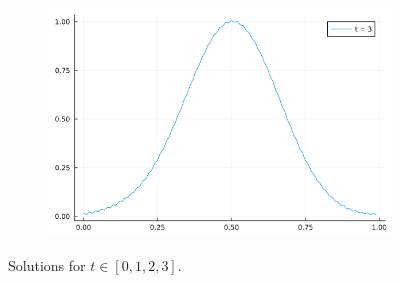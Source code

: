 \documentclass[12pt]{report}
\begin{document}
\begin{solution}
\begin{figure}[H]
\begin{subfigure}{0.495\linewidth}
      \end{subfigure}
      \begin{subfigure}{0.495\linewidth}
        \centering
        \includegraphics[width=\linewidth]{images/3-4.png}
      \end{subfigure}
      \caption{Solutions for $t\in[0,1,2,3]$.}
    \end{figure}
\end{solution}

\newpage


\end{document}

